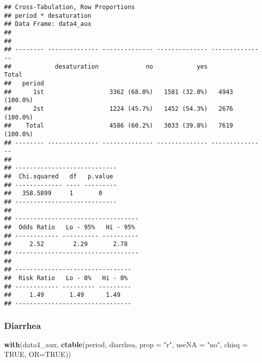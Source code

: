 \documentclass[
]{article}
\newenvironment{Shaded}{\begin{snugshade}}{\end{snugshade}}
\newcommand{\DataTypeTok}[1]{\textcolor[rgb]{0.13,0.29,0.53}{#1}}
\newcommand{\KeywordTok}[1]{\textcolor[rgb]{0.13,0.29,0.53}{\textbf{#1}}}
\newcommand{\NormalTok}[1]{#1}
\newcommand{\OtherTok}[1]{\textcolor[rgb]{0.56,0.35,0.01}{#1}}
\newcommand{\StringTok}[1]{\textcolor[rgb]{0.31,0.60,0.02}{#1}}
\begin{document}
\begin{verbatim}
## Cross-Tabulation, Row Proportions  
## period * desaturation  
## Data Frame: data4_aux  
## 
## 
## -------- -------------- -------------- -------------- ---------------
##            desaturation             no            yes           Total
##   period                                                             
##      1st                  3362 (68.0%)   1581 (32.0%)   4943 (100.0%)
##      2st                  1224 (45.7%)   1452 (54.3%)   2676 (100.0%)
##    Total                  4586 (60.2%)   3033 (39.8%)   7619 (100.0%)
## -------- -------------- -------------- -------------- ---------------
## 
## ----------------------------
##  Chi.squared   df   p.value 
## ------------- ---- ---------
##   358.5899     1       0    
## ----------------------------
## 
## ----------------------------------
##  Odds Ratio   Lo - 95%   Hi - 95% 
## ------------ ---------- ----------
##     2.52        2.29       2.78   
## ----------------------------------
## 
## --------------------------------
##  Risk Ratio   Lo - 0%   Hi - 0% 
## ------------ --------- ---------
##     1.49       1.49      1.49   
## --------------------------------
\end{verbatim}

\hypertarget{diarrhea-2}{%
\subsubsection{Diarrhea}\label{diarrhea-2}}

\begin{Shaded}
\begin{Highlighting}[]
\KeywordTok{with}\NormalTok{(data4_aux, }\KeywordTok{ctable}\NormalTok{(period, diarrhea, }\DataTypeTok{prop =} \StringTok{"r"}\NormalTok{, }\DataTypeTok{useNA =} \StringTok{"no"}\NormalTok{, }\DataTypeTok{chisq =} \OtherTok{TRUE}\NormalTok{, }\DataTypeTok{OR=}\OtherTok{TRUE}\NormalTok{))}
\end{Highlighting}
\end{Shaded}
\end{document}
